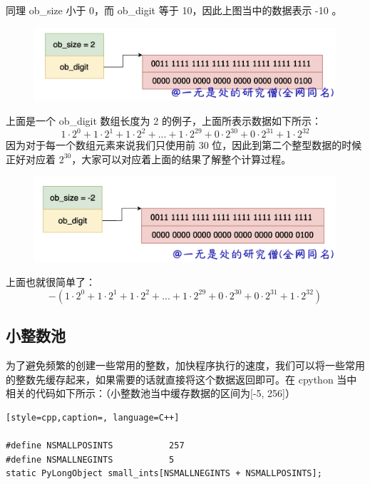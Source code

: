 同理 ob\_size 小于 0，而 ob\_digit 等于 10，因此上图当中的数据表示 -10 。

    \begin{figure}[h]
        \centering
            \includegraphics[scale=.3]{images/18-int.png}
            \caption{ }
        \label{fig:my_label}
    \end{figure}
    
上面是一个 ob\_digit 数组长度为 2 的例子，上面所表示数据如下所示：
$$
1 \cdot2^0 + 1 \cdot2^1 + 1 \cdot2^2 + ... + 1 \cdot2^{29} + 0 \cdot2^{30} + 0 \cdot2^{31} + 1 \cdot2^{32}
$$
因为对于每一个数组元素来说我们只使用前 30 位，因此到第二个整型数据的时候正好对应着 $2^{30}$，大家可以对应着上面的结果了解整个计算过程。

    \begin{figure}[h]
        \centering
            \includegraphics[scale=.3]{images/19-int.png}
            \caption{ }
        \label{fig:my_label}
    \end{figure}
    
上面也就很简单了：
$$
-(1 \cdot2^0 + 1 \cdot2^1 + 1 \cdot2^2 + ... + 1 \cdot2^{29} + 0 \cdot2^{30} + 0 \cdot2^{31} + 1 \cdot2^{32})
$$
\subsection{小整数池}
为了避免频繁的创建一些常用的整数，加快程序执行的速度，我们可以将一些常用的整数先缓存起来，如果需要的话就直接将这个数据返回即可。在 cpython 当中相关的代码如下所示：（小整数池当中缓存数据的区间为[-5, 256]）
\begin{lstlisting}[style=cpp,caption=, language=C++]

#define NSMALLPOSINTS           257
#define NSMALLNEGINTS           5
static PyLongObject small_ints[NSMALLNEGINTS + NSMALLPOSINTS];
\end{lstlisting}

